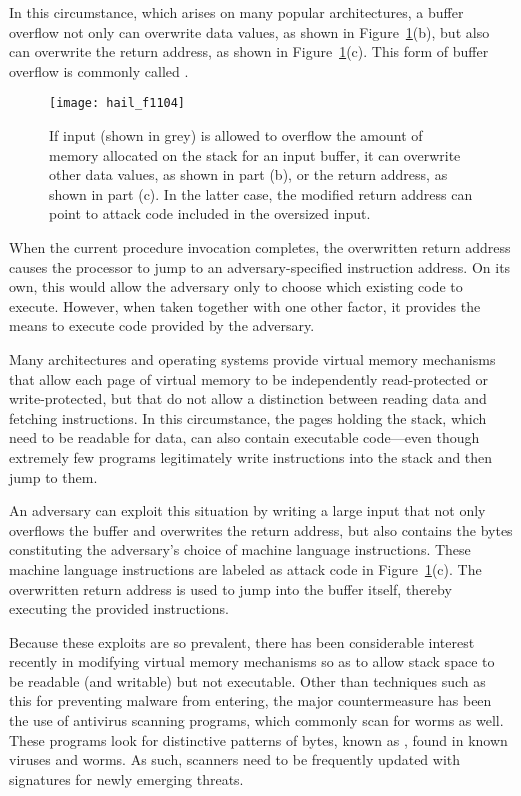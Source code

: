 In this circumstance, which arises on many popular
architectures, a buffer overflow not only can overwrite data values,
as shown in Figure~\ref{stack-smashing}(b), but also can overwrite the
return address, as shown in Figure~\ref{stack-smashing}(c).  This form
of buffer overflow is commonly called .
\begin{figure}
\centerline{\texttt{[image: hail\_f1104]}}
\caption{If input (shown in grey) is allowed to overflow the amount of memory
  allocated on the stack for an input buffer, it can overwrite other
  data values, as shown in part (b), or the return address, as shown
  in part (c).  In the latter case, the modified return address can point to
  attack code included in the oversized input.}
\label{stack-smashing}
\end{figure}
When the current procedure invocation completes, the overwritten
return address causes the processor to jump to an adversary-specified instruction
address.  On its own,
this would allow the adversary only to choose which existing code to
execute.  However, when taken together with one other factor, it
provides the means to execute code provided by the adversary.

Many architectures and operating systems provide virtual memory
mechanisms that allow each page of virtual memory to be independently
read-protected or write-protected, but that do not allow a
distinction between reading data and fetching instructions.  In this
circumstance, the pages holding the stack, which need to be readable
for data, can also contain executable code---even though extremely few
programs legitimately write instructions into the stack and then jump
to them.

An adversary can exploit this situation by writing a large input that
not only overflows the buffer and overwrites the return address, but
also contains the bytes constituting the adversary's choice of machine
language instructions.  These machine language instructions 
are labeled as attack code in Figure~\ref{stack-smashing}(c).  The overwritten return address is used to jump
into the buffer itself, thereby executing the provided instructions.

Because these exploits are so prevalent, there has been considerable
interest recently in modifying virtual memory mechanisms so as to
allow stack space to be readable (and writable) but not executable.
Other than techniques such as this for preventing malware from
entering, the major countermeasure has been the use of antivirus
scanning programs, which commonly scan for worms as well.  These
programs look for distinctive patterns of bytes, known as
, found in known viruses and worms.  As such,
scanners need to be frequently updated with signatures for newly
emerging threats.

